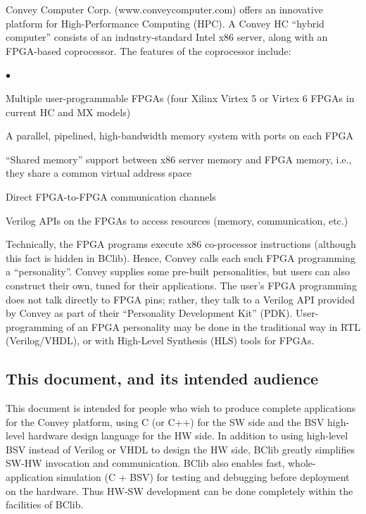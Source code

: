\documentclass[twoside,letterpaper,11pt]{article}
\newenvironment{tightlist}%
{\begin{list}{$\bullet$}{%
    \setlength{\topsep}{0in}
    \setlength{\partopsep}{0in}
    \setlength{\itemsep}{0in}
    \setlength{\parsep}{0in}
    \setlength{\leftmargin}{1.5em}
    \setlength{\rightmargin}{0in}
    \setlength{\itemindent}{0in}
}
}%
{\end{list}
}
\begin{document}
Convey Computer Corp. (www.conveycomputer.com) offers an
innovative platform for High-Performance Computing (HPC).  A Convey HC
``hybrid computer'' consists of an industry-standard Intel x86 server, along with
an FPGA-based coprocessor.  The features of the coprocessor include:
\begin{tightlist}
\item Multiple user-programmable FPGAs (four Xilinx Virtex 5 or Virtex 6 FPGAs in current HC and MX models)
\item A parallel, pipelined, high-bandwidth memory system with ports on each FPGA
\item ``Shared memory'' support between x86 server memory and FPGA
    memory, i.e., they share a common virtual address space
\item Direct FPGA-to-FPGA communication channels
\item Verilog APIs on the FPGAs to access resources (memory, communication, etc.)
\end{tightlist}
Technically, the FPGA programs execute x86 co-processor instructions
(although this fact is hidden in BClib).  Hence, Convey calls each
such FPGA programming a ``personality''.  Convey supplies some
pre-built personalities, but users can also construct their own, tuned
for their applications.  The user's FPGA programming does not talk
directly to FPGA pins; rather, they talk to a Verilog API provided by
Convey as part of their ``Personality Development Kit'' (PDK).
User-programming of an FPGA personality may be done in the traditional
way in RTL (Verilog/VHDL), or with High-Level Synthesis (HLS) tools
for FPGAs.


\subsection{This document, and its intended audience}

This document is intended for people who wish to produce complete
applications for the Convey platform, using C (or C++) for the SW side
and the BSV high-level hardware design language for the HW side.  In
addition to using high-level BSV instead of Verilog or VHDL to design
the HW side, BClib greatly simplifies SW-HW invocation and
communication.  BClib also enables fast, whole-application simulation
(C + BSV) for testing and debugging before deployment on the hardware.
Thus HW-SW development can be done completely within the facilities of
BClib.
\end{document}
